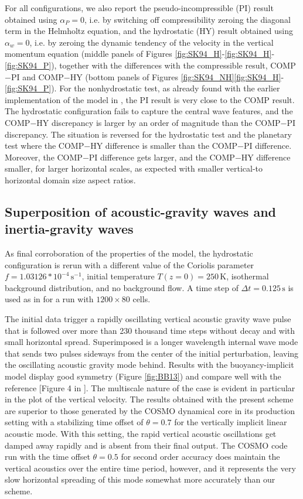 \documentclass{ametsoc}
\newcommand{\sblue}[1]{\textcolor{sblue}{#1}}
\newcommand{\revision}[1]{\sblue{#1}}
\theoremstyle{definition}
\newcommand{\dt}{\Delta t}
\begin{document}
\revision{For all configurations,} we also report the pseudo-incompressible (PI) result obtained using $\alpha_P=0$, i.e. by switching off compressibility zeroing the diagonal term in the Helmholtz equation, and the hydrostatic (HY) result obtained using $\alpha_w=0$, i.e. by zeroing the dynamic tendency of the velocity in the vertical momentum equation (middle panels of Figures \ref{fig:SK94_H}-\ref{fig:SK94_H}-\ref{fig:SK94_P}), together with the differences with the compressible result, COMP$-$PI and COMP$-$HY (bottom panels of Figures \ref{fig:SK94_NH}\ref{fig:SK94_H}-\ref{fig:SK94_P}). \revision{For the nonhydrostatic test, as already found with the earlier implementation of the model in \cite{BenacchioEtAl2014}, the PI result is very close to the COMP result. The hydrostatic configuration fails to capture the central wave features, and the COMP$-$HY discrepancy is larger by an order of magnitude than the COMP$-$PI discrepancy. The situation is reversed for the hydrostatic test and the planetary test where the COMP$-$HY difference is smaller than the COMP$-$PI difference. Moreover, the COMP$-$PI difference gets larger, and the COMP$-$HY difference smaller, for larger horizontal scales, as expected with smaller vertical-to horizontal domain size aspect ratios.}

\subsection{Superposition of acoustic-gravity waves and inertia-gravity waves}

As final corroboration of the properties of the model, the hydrostatic configuration is rerun with a different value of the Coriolis parameter $f=1.03126*10^{-4}\,\textrm{s}^{-1}$, initial temperature $T(z=0)=250\,\textrm{K}$, isothermal background distribution, and no background flow. A time step of $\dt=0.125\,\textrm{s}$ is used as in \cite{BaldaufBrdar2013} for a run with $1200\times80$ cells. 

The initial data trigger a rapidly oscillating vertical acoustic gravity wave pulse that is followed over more than 230 thousand time steps without decay and with small horizontal spread. Superimposed is a longer wavelength internal wave mode that sends two pulses sideways from the center of the initial perturbation, leaving the oscillating acoustic gravity mode behind. Results with the buoyancy-implicit model display good symmetry (Figure \ref{fig:BB13}) and compare well with the reference [Figure 4 in \cite{BaldaufBrdar2013}]. The multiscale nature of the case is evident in particular in the plot of the vertical velocity. \revision{The results obtained with the present scheme are superior to those generated by the COSMO dynamical core in its production setting with a stabilizing time offset of $\theta = 0.7$ for the vertically implicit linear acoustic mode. With this setting, the rapid vertical acoustic oscillations get damped away rapidly and is absent from their final output. The COSMO code run with the time offset $\theta=0.5$ for second order accuracy does maintain the vertical acoustics over the entire time period, however, and it represents the very slow horizontal spreading of this mode somewhat more accurately than our scheme.}
\end{document}
